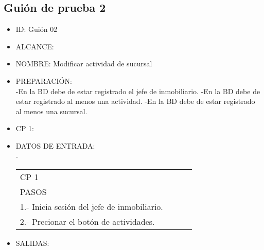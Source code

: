 \subsection{Guión de prueba 2}
\begin{itemize}
	\item ID: Guión 02
	\item ALCANCE: 
	\item NOMBRE: Modificar actividad de sucursal 
	\item PREPARACIÓN:\\
	-En la BD debe de estar registrado el jefe de inmobiliario.
	-En la BD debe de estar registrado al menos una actividad.
	-En la BD debe de estar registrado al menos una sucursal.
	\item CP 1:
	\item DATOS DE ENTRADA:\\
	-
	\begin{center}			
		\begin{tabular}{|l|l|l|l|}
			\hline
			CP 1\\
			PASOS\\
			\hline 1.- Inicia sesión del jefe de inmobiliario.\\
			\hline 2.- Precionar el botón de actividades.\\
			\hline
		\end{tabular}
	\end{center}
	\item SALIDAS: \label{CU1LoginJI}
	
\end{itemize}

